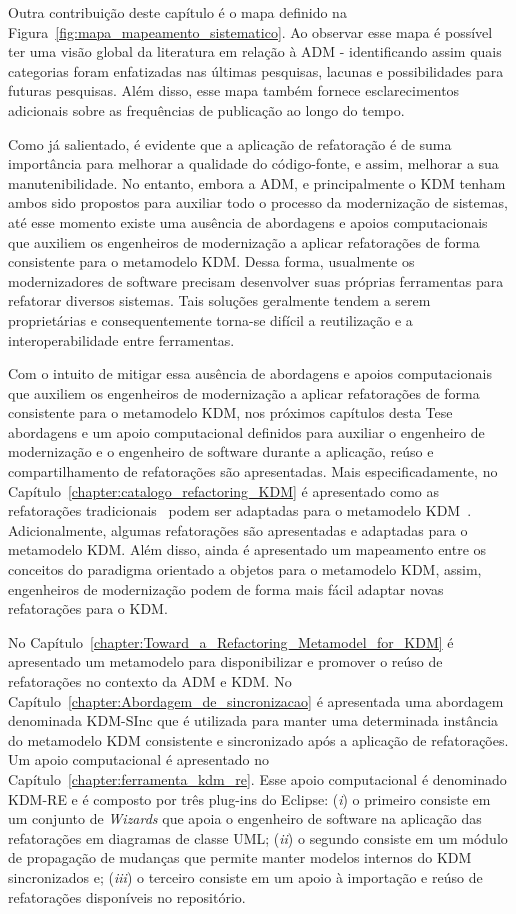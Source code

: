 Outra contribuição deste capítulo é o mapa definido na Figura~\ref{fig:mapa_mapeamento_sistematico}. Ao observar esse mapa é possível ter uma visão global da literatura em relação à ADM - identificando assim quais categorias foram enfatizadas nas últimas pesquisas, lacunas e possibilidades para futuras pesquisas. Além disso, esse mapa também fornece esclarecimentos adicionais sobre as frequências de publicação ao longo do tempo.

Como já salientado, é evidente que a aplicação de refatoração é de suma importância para melhorar a qualidade do código-fonte, e assim, melhorar a sua manutenibilidade.
No entanto, embora a ADM, e principalmente o KDM tenham ambos sido propostos para auxiliar todo o processo da modernização de sistemas, até esse momento existe uma ausência de abordagens e apoios computacionais que auxiliem os engenheiros de modernização a aplicar refatorações de forma consistente para o metamodelo KDM. Dessa forma, usualmente os modernizadores de software precisam desenvolver suas próprias ferramentas para refatorar diversos sistemas. Tais soluções geralmente tendem a serem proprietárias e consequentemente torna-se difícil a reutilização e a interoperabilidade entre ferramentas. 


Com o intuito de mitigar essa ausência de abordagens e apoios computacionais que auxiliem os engenheiros de modernização a aplicar refatorações de forma consistente para o metamodelo KDM, nos próximos capítulos desta Tese abordagens e um apoio computacional definidos para auxiliar o engenheiro de modernização e o engenheiro de software durante a aplicação, reúso e compartilhamento de refatorações são apresentadas. Mais especificadamente, no Capítulo~\ref{chapter:catalogo_refactoring_KDM} é apresentado como as refatorações tradicionais~\cite{Fowler1999} podem ser adaptadas para o metamodelo KDM~\cite{durelli_catalogo, durelli_VEM_ferramenta}. Adicionalmente, algumas refatorações são apresentadas e adaptadas para o metamodelo KDM. Além disso, ainda é apresentado um mapeamento entre os conceitos do paradigma orientado a objetos para o metamodelo KDM, assim, engenheiros de modernização podem de forma mais fácil adaptar novas refatorações para o KDM.

No Capítulo~\ref{chapter:Toward_a_Refactoring_Metamodel_for_KDM} é apresentado um metamodelo para disponibilizar e promover o reúso de refatorações no contexto da ADM e KDM. No Capítulo~\ref{chapter:Abordagem_de_sincronizacao} é apresentada uma abordagem denominada KDM-SInc que é utilizada para manter uma determinada instância do metamodelo KDM consistente e sincronizado após a aplicação de refatorações. Um apoio computacional é apresentado no Capítulo~\ref{chapter:ferramenta_kdm_re}. Esse apoio computacional é denominado KDM-RE e é composto por três plug-ins do Eclipse: (\textit{i}) o primeiro consiste em um conjunto de \textit{Wizards} que apoia o engenheiro de software na aplicação das refatorações em diagramas de classe UML; (\textit{ii}) o segundo consiste em um módulo de propagação de mudanças que permite manter modelos internos do KDM sincronizados e; (\textit{iii}) o terceiro consiste em um apoio à importação e reúso de refatorações disponíveis no repositório.